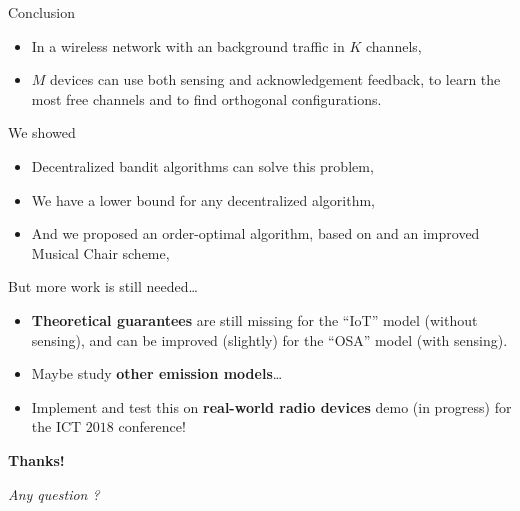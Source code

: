 \documentclass[12pt,english,ignorenonframetext,aspectratio=169,]{beamer}
\providecommand{\tightlist}{%
  \setlength{\itemsep}{0pt}\setlength{\parskip}{0pt}}
\begin{document}
\begin{frame}[allowframebreaks]{Conclusion}

\begin{itemize}
\tightlist
\item
  In a wireless network with an \iid{} background traffic in \(K\)
  channels,
\item
  \(M\) devices can use both sensing and acknowledgement feedback, to
  learn the most free channels and to find orthogonal configurations.
\end{itemize}

\begin{block}{We showed \Smiley[1.2]}

\begin{itemize}
\tightlist
\item
  Decentralized bandit algorithms can solve this problem,
\item
  We have a lower bound for any decentralized algorithm,
\item
  And we proposed an order-optimal algorithm, based on \klUCB{} and an
  improved Musical Chair scheme, \MCTopM
\end{itemize}

\end{block}

\begin{block}{But more work is still needed\ldots{} \Sey[1.2]}

\begin{itemize}
\tightlist
\item
  \textbf{Theoretical guarantees} are still missing for the ``IoT''
  model (without sensing), and can be improved (slightly) for the
  ``OSA'' model (with sensing).
\item
  Maybe study \textbf{other emission models}\ldots{}
\item
  Implement and test this on \textbf{real-world radio devices}
  \hook demo (in progress) for the ICT \(2018\) conference!
\end{itemize}

\end{block}

\vspace*{10pt}

\begin{center}\begin{Large}
\textbf{Thanks!} \Smiley[1.2]

\emph{Any question ?}
\end{Large}\end{center}

\end{frame}
\end{document}
